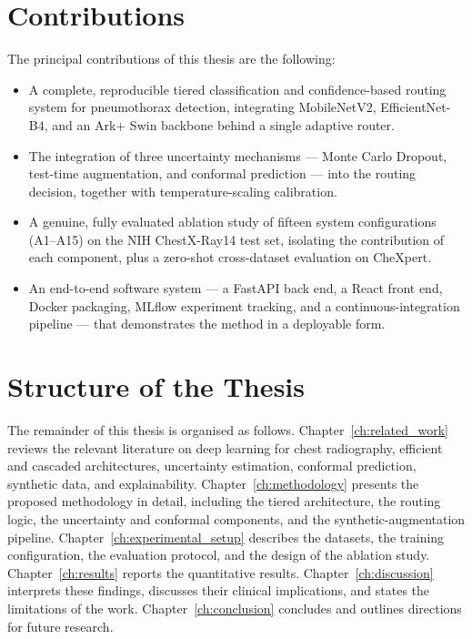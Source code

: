 \section{Contributions}
The principal contributions of this thesis are the following:
\begin{itemize}
    \item A complete, reproducible tiered classification and confidence-based routing system for pneumothorax detection, integrating MobileNetV2, EfficientNet-B4, and an Ark+ Swin backbone behind a single adaptive router.
    \item The integration of three uncertainty mechanisms --- Monte Carlo Dropout, test-time augmentation, and conformal prediction --- into the routing decision, together with temperature-scaling calibration.
    \item A genuine, fully evaluated ablation study of fifteen system configurations (A1--A15) on the NIH ChestX-Ray14 test set, isolating the contribution of each component, plus a zero-shot cross-dataset evaluation on CheXpert.
    \item An end-to-end software system --- a FastAPI back end, a React front end, Docker packaging, MLflow experiment tracking, and a continuous-integration pipeline --- that demonstrates the method in a deployable form.
\end{itemize}

\section{Structure of the Thesis}
The remainder of this thesis is organised as follows. Chapter~\ref{ch:related_work} reviews the relevant literature on deep learning for chest radiography, efficient and cascaded architectures, uncertainty estimation, conformal prediction, synthetic data, and explainability. Chapter~\ref{ch:methodology} presents the proposed methodology in detail, including the tiered architecture, the routing logic, the uncertainty and conformal components, and the synthetic-augmentation pipeline. Chapter~\ref{ch:experimental_setup} describes the datasets, the training configuration, the evaluation protocol, and the design of the ablation study. Chapter~\ref{ch:results} reports the quantitative results. Chapter~\ref{ch:discussion} interprets these findings, discusses their clinical implications, and states the limitations of the work. Chapter~\ref{ch:conclusion} concludes and outlines directions for future research.
